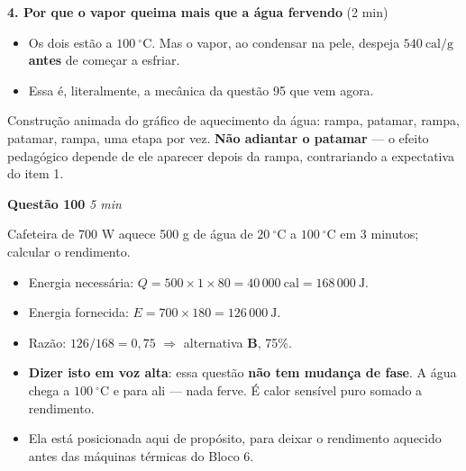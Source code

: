 \documentclass[11pt,a4paper]{article}
\newcommand{\questao}[3]{%
  \needspace{4\baselineskip}\medskip
  {\bfseries\color{vinho}#1}\quad{\small\itshape\color{grafite}#2}%
  \hfill{\small\itshape\color{grafite}#3}\par\smallskip}
\begin{document}
\begin{quadro}
\medskip
\textbf{4. Por que o vapor queima mais que a \'agua fervendo} (2 min)
\begin{itemize}[nosep]
  \item Os dois est\~ao a $100\ ^\circ$C. Mas o vapor, ao condensar na
        pele, despeja $540\ \text{cal/g}$ \textbf{antes} de come\c{c}ar a
        esfriar.
  \item Essa \'e, literalmente, a mec\^anica da quest\~ao 95 que vem agora.
\end{itemize}
\end{quadro}

\begin{projetor}
Constru\c{c}\~ao animada do gr\'afico de aquecimento da \'agua: rampa, patamar,
rampa, patamar, rampa, uma etapa por vez. \textbf{N\~ao adiantar o
patamar} --- o efeito pedag\'ogico depende de ele aparecer depois da
rampa, contrariando a expectativa do item 1.

\medskip
\questao{Quest\~ao 100}{ENEM 2024, caderno cinza}{5 min}
Cafeteira de 700 W aquece 500 g de \'agua de $20\ ^\circ$C a
$100\ ^\circ$C em 3 minutos; calcular o rendimento.
\begin{itemize}[nosep]
  \item Energia necess\'aria:
        $Q = 500 \times 1 \times 80 = 40\,000\ \text{cal}
        = 168\,000\ \text{J}$.
  \item Energia fornecida:
        $E = 700 \times 180 = 126\,000\ \text{J}$.
  \item Raz\~ao: $126/168 = 0{,}75$ \quad $\Rightarrow$ \quad alternativa
        \textbf{B}, 75\%.
  \item \textbf{Dizer isto em voz alta}: essa quest\~ao \textbf{n\~ao tem
        mudan\c{c}a de fase}. A \'agua chega a $100\ ^\circ$C e para ali ---
        nada ferve. \'E calor sens\'ivel puro somado a rendimento.
  \item Ela est\'a posicionada aqui de prop\'osito, para deixar o rendimento
        aquecido antes das m\'aquinas t\'ermicas do Bloco 6.
\end{itemize}


\end{projetor}
\end{document}
